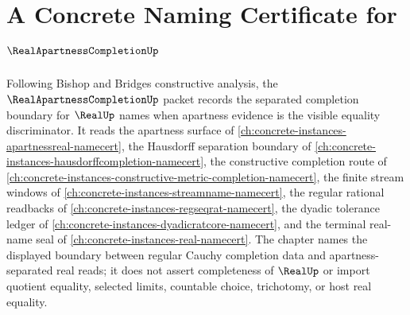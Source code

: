 \chapter{A Concrete Naming Certificate for $\RealApartnessCompletionUp$}
\label{ch:concrete-instances-realapartnesscompletion-namecert}

Following Bishop and Bridges constructive analysis, the $\RealApartnessCompletionUp$ packet records the separated completion boundary for $\RealUp$ names when apartness evidence is the visible equality discriminator. It reads the apartness surface of \autoref{ch:concrete-instances-apartnessreal-namecert}, the Hausdorff separation boundary of \autoref{ch:concrete-instances-hausdorffcompletion-namecert}, the constructive completion route of \autoref{ch:concrete-instances-constructive-metric-completion-namecert}, the finite stream windows of \autoref{ch:concrete-instances-streamname-namecert}, the regular rational readbacks of \autoref{ch:concrete-instances-regseqrat-namecert}, the dyadic tolerance ledger of \autoref{ch:concrete-instances-dyadicratcore-namecert}, and the terminal real-name seal of \autoref{ch:concrete-instances-real-namecert}. The chapter names the displayed boundary between regular Cauchy completion data and apartness-separated real reads; it does not assert completeness of $\RealUp$ or import quotient equality, selected limits, countable choice, trichotomy, or host real equality.

